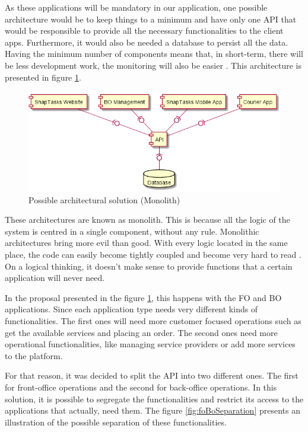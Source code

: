 \par
As these applications will be mandatory in our application, one possible architecture would be to keep things to a minimum and have only one \gls{API} that would be responsible to provide all the necessary functionalities to the client apps. Furthermore, it would also be needed a database to persist all the data. Having the minimum number of components means that, in short-term, there will be less development work, the monitoring will also be easier \parencite{monolithProsAndCons}. This architecture is presented in figure \ref{fig:monolithProposal}. 
\par

\begin{figure}[ht]
\centering
\includegraphics[width=\textwidth,keepaspectratio]{chapters/Architectural_Overview/assets/Monolith.png}
\caption[Possible architectural solution (Monolith)]{Possible architectural solution (Monolith)}
\label{fig:monolithProposal}
\end{figure}

\par

These architectures are known as monolith. This is because all the logic of the system is centred in a single component, without any rule. Monolithic architectures bring more evil than good. With every logic located in the same place, the code can easily become tightly coupled and become very hard to read \parencite{monolithAreBadDesign}. On a logical thinking, it doesn't make sense to provide functions that a certain application will never need. 
\par
In the proposal presented in the figure \ref{fig:monolithProposal}, this happens with the \gls{FO} and \gls{BO} applications. Since each application type needs very different kinds of functionalities. The first ones will need more customer focused operations such as get the available services and placing an order. The second ones need more operational functionalities, like managing service providers or add more services to the platform. 
\par
For that reason, it was decided to split the \gls{API} into two different ones. The first for front-office operations and the second for back-office operations. In this solution, it is possible to segregate the functionalities and restrict its access to the applications that actually, need them. The figure \ref{fig:foBoSeparation} presents an illustration of the possible separation of these functionalities.

